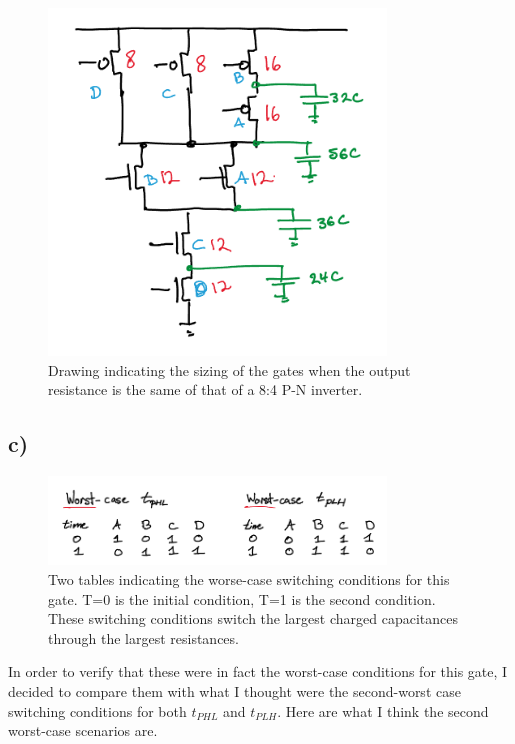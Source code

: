 \documentclass[11pt]{article}
\begin{document}
\begin{figure}[H]
\centering
  \includegraphics[width=0.8\textwidth]{q2size.png}
  \caption{Drawing indicating the sizing of the gates when the output resistance is the same of that of a 8:4 P-N inverter.}
\end{figure}

\subsection{c)}

\begin{figure}[H]
\centering
  \includegraphics[width=0.8\textwidth]{q2worstcase.png}
  \caption{Two tables indicating the worse-case switching conditions for this gate. T=0 is the initial condition, T=1 is the second condition. These switching conditions switch the largest charged capacitances through the largest resistances.}
\end{figure}

In order to verify that these were in fact the worst-case conditions for this gate, I decided to compare them with what I thought were the second-worst case switching conditions for both $t_{PHL}$ and $t_{PLH}$. Here are what I think the second worst-case scenarios are. 
\end{document}
